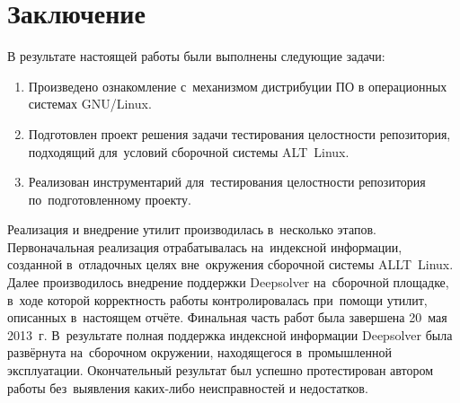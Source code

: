 \section*{Заключение}

В результате настоящей работы были выполнены следующие задачи:

\begin{enumerate}
\item{Произведено ознакомление с~механизмом дистрибуции ПО в операционных системах GNU/Linux.}
\item{Подготовлен проект решения задачи тестирования целостности репозитория,
подходящий для~условий сборочной системы ALT~Linux.}
\item{Реализован инструментарий для~тестирования целостности репозитория по~подготовленному проекту.}
\end{enumerate}

Реализация и внедрение утилит производилась в~несколько этапов. 
Первоначальная реализация отрабатывалась на~индексной информации, созданной в~отладочных целях вне~окружения сборочной системы ALLT~Linux.
Далее производилось внедрение поддержки Deepsolver на~сборочной площадке,
в~ходе которой корректность работы контролировалась при~помощи утилит, описанных в~настоящем отчёте.
Финальная часть работ была завершена 20~мая 2013~г.
В~результате полная поддержка индексной информации Deepsolver была развёрнута на~сборочном окружении, 
находящегося в~промышленной эксплуатации.
Окончательный результат был успешно протестирован автором работы
без~выявления каких-либо неисправностей и недостатков.
